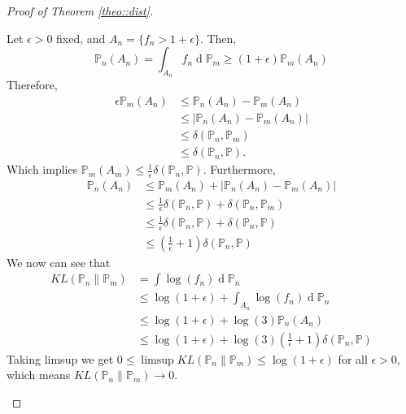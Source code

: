 \documentclass{article} %
\newcommand\PP{\mathbb{P}}
\renewcommand{\d}[1]{\ensuremath{\operatorname{d}\!{#1}}}
\theoremstyle{definition}
\theoremstyle{definition}
\begin{document}
\begin{appendices}
\begin{proof}[Proof of Theorem \ref{theo::dist}]
\begin{enumerate}
\begin{itemize}
        Let $\epsilon > 0$ fixed,
        and $A_n = \{f_n > 1 + \epsilon\}$. Then, 
        $$ \PP_n(A_n) = \int_{A_n} f_n \d \PP_m \geq (1 + \epsilon) \PP_m(A_n)$$
        Therefore,
        \begin{align*}
          \epsilon \PP_m(A_n) &\leq \PP_n(A_n) - \PP_m(A_n) \\
          &\leq |\PP_n(A_n) - \PP_m(A_n)| \\
          &\leq \delta(\PP_n, \PP_m) \\
          &\leq \delta(\PP_n, \PP).
        \end{align*}
        Which implies $\PP_m(A_m) \leq \frac{1}{\epsilon} \delta(\PP_n, \PP)$. Furthermore,
        \begin{align*}
          \PP_n(A_n) &\leq \PP_m(A_n) + |\PP_n(A_n) - \PP_m(A_n)| \\
          &\leq \frac{1}{\epsilon} \delta(\PP_n, \PP) + \delta(\PP_n, \PP_m) \\
          &\leq \frac{1}{\epsilon} \delta(\PP_n, \PP) + \delta(\PP_n, \PP) \\
          &\leq \left(\frac{1}{\epsilon} + 1\right) \delta(\PP_n, \PP)
        \end{align*}
        We now can see that
        \begin{align*}
          KL(\PP_n \| \PP_m) &= \int \log(f_n) \d \PP_n \\
          &\leq \log(1 + \epsilon) + \int_{A_n} \log(f_n) \d \PP_n \\
          &\leq \log(1 + \epsilon) + \log(3) \PP_n(A_n) \\
          &\leq \log(1 + \epsilon) + \log(3) \left(\frac{1}{\epsilon} + 1\right) \delta(\PP_n, \PP)
        \end{align*}
        Taking limsup we get $0 \leq \limsup KL(\PP_n \| \PP_m) \leq \log(1 + \epsilon)$
        for all $\epsilon > 0$, which means $KL(\PP_n \| \PP_m) \to 0$.
        

\end{itemize}
\end{enumerate}
\end{proof}
\end{appendices}
\end{document}
